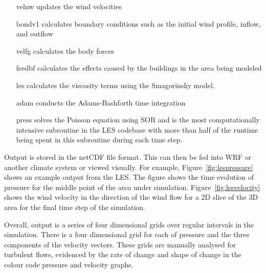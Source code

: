 \begin{itemize}[noitemsep,nolistsep]

    \item[velnw] updates the wind velocities

    \item[bondv1] calculates boundary conditions such as the initial wind
    profile, inflow, and outflow

    \item[velfg] calculates the body forces

    \item[feedbf] calculates the effects caused by the buildings in the area
    being modeled

    \item[les] calculates the viscosity terms using the Smagorinsky model.

    \item[adam] conducts the Adams-Bashforth time integration

    \item[press] solves the Poisson equation using SOR and is the most
    computationally intensive subroutine in the LES codebase with more than half
    of the runtime being spent in this subroutine during each time step.

\end{itemize}

Output is stored in the netCDF file format. This can then be fed into WRF or
another climate system or viewed visually. For example,
Figure~\ref{fig:lespressure} shows an example output from the LES. The figure
shows the time evolution of pressure for the middle point of the area under
simulation. Figure~\ref{fig:lesvelocity} shows the wind velocity in the
direction of the wind flow for a 2D slice of the 3D area for the final time step
of the simulation.

Overall, output is a series of four dimensional grids over regular intervals in
the simulation. There is a four dimensional grid for each of pressure and the
three components of the velocity vectors. These grids are manually analysed for
turbulent flows, evidenced by the rate of change and shape of change in the
colour code pressure and velocity graphs.
